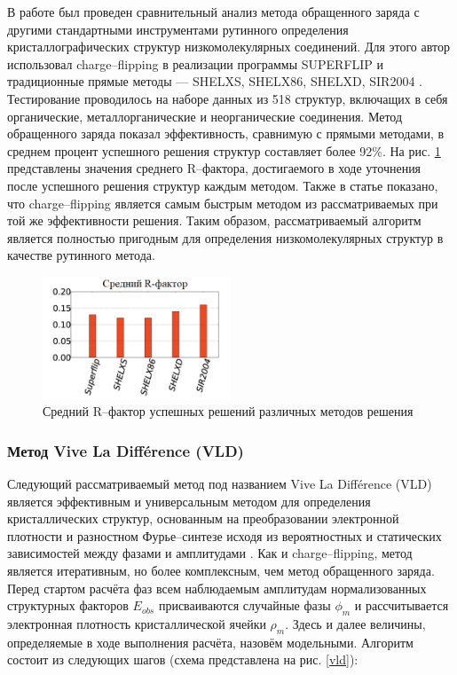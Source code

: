 В работе \cite{van_der_lee_charge_nodate} был проведен сравнительный анализ метода обращенного заряда с другими стандартными инструментами рутинного определения кристаллографических структур низкомолекулярных соединений. Для этого автор использовал charge--flipping в реализации программы SUPERFLIP \cite{palatinus_it_2007} и традиционные прямые методы --- SHELXS, SHELX86, SHELXD, SIR2004 \cite{sheldrick_shelxt_2015}. Тестирование проводилось на наборе данных из 518 структур, включащих в себя органические, металлорганические и неорганические соединения. Метод обращенного заряда показал эффективность, сравнимую с прямыми методами, в среднем процент успешного решения структур составляет более 92\%. На рис. \ref{charge_direct} представлены значения среднего R--фактора, достигаемого в ходе уточнения после успешного решения структур каждым методом. Также в статье показано, что charge--flipping является самым быстрым методом из рассматриваемых при той же эффективности решения. Таким образом, рассматриваемый алгоритм является полностью пригодным для определения низкомолекулярных структур в качестве рутинного метода.


\begin{figure}[H]
	\centering
	\includegraphics[width=0.5\textwidth]{figures/charge_direct.png}\hfill
	\caption{Средний R--фактор успешных решений различных методов решения}
	\label{charge_direct}
\end{figure}

\subsubsection{Метод Vive La Diff\'erence (VLD)}

Следующий рассматриваемый метод под названием Vive La Diff\'erence (VLD) является эффективным и универсальным методом для определения кристаллических структур, основанным на преобразовании электронной плотности и разностном Фурье--синтезе исходя из вероятностных и статических зависимостей между фазами и амплитудами \cite{burla_random_2010}. Как и charge--flipping, метод является итеративным, но более комплексным, чем метод обращенного заряда. Перед стартом расчёта фаз всем наблюдаемым амплитудам нормализованных структурных факторов $E_{obs}$ присваиваются случайные фазы $\phi_m$ и рассчитывается электронная плотность кристаллической ячейки $\rho_m$. Здесь и далее величины, определяемые в ходе выполнения расчёта, назовём модельными. Алгоритм состоит из следующих шагов (схема представлена на рис. \ref{vld}):

